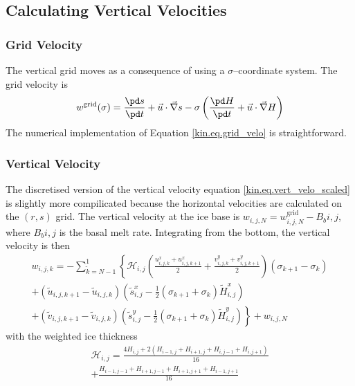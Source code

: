 \subsection{Calculating Vertical Velocities}

\subsubsection{Grid Velocity}
The vertical grid moves as a consequence of using a $\sigma$--coordinate system. The grid velocity is
\begin{equation}
  \label{kin.eq.grid_velo}
  w^{\text{grid}}(\sigma)=\frac{\pd s}{\pd t}+\vec u\cdot\vec\nabla s-\sigma\left(\frac{\pd H}{\pd t}+\vec u\cdot\vec\nabla H\right)
\end{equation}
The numerical implementation of Equation \eqref{kin.eq.grid_velo} is straightforward.

\subsubsection{Vertical Velocity}
The discretised version of the vertical velocity equation \eqref{kin.eq.vert_velo_scaled} is slightly more compilicated because the horizontal velocities are calculated on the $(r,s)$ grid. The vertical velocity at the ice base is $w_{i,j,N}=w^{\text{grid}}_{i,j,N}-B_b{i,j}$, where $B_b{i,j}$ is the basal melt rate. Integrating from the bottom, the vertical velocity is then
\begin{equation}
  \label{kin.eq.wvel_unc}
  \begin{split}
  w_{i,j,k}=-\sum_{\tilde{k}=N-1}^1\left\{\mathcal{H}_{i,j}\left(\frac{u^x_{i,j,k}+u^x_{i,j,k+1}}{2}+\frac{v^y_{i,j,k}+v^y_{i,j,k+1}}{2}\right)(\sigma_{k+1}-\sigma_k)\right. \\
     +(\tilde{u}_{i,j,k+1}-\tilde{u}_{i,j,k})  \left(\tilde{s}^x_{i,j}-\frac12(\sigma_{k+1}+\sigma_k)\tilde{H}^x_{i,j}\right)  \\
     \left.+(\tilde{v}_{i,j,k+1}-\tilde{v}_{i,j,k})  \left(\tilde{s}^y_{i,j}-\frac12(\sigma_{k+1}+\sigma_k)\tilde{H}^y_{i,j}\right)\right\} + w_{i,j,N}
  \end{split}
\end{equation}
with the weighted ice thickness
\begin{equation*}
  \begin{split}
  \mathcal{H}_{i,j}=\frac{4H_{i,j}+2(H_{i-1,j}+H_{i+1,j}+H_{i,j-1}+H_{i,j+1})}{16}\\
  +\frac{H_{i-1,j-1}+H_{i+1,j-1}+H_{i+1,j+1}+H_{i-1,j+1}}{16}    
  \end{split}
\end{equation*}

